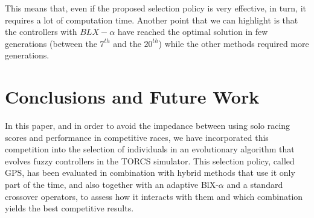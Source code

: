 \documentclass[10pt,journal,compsoc]{IEEEtran}
\begin{document}
This means that, even if the proposed selection policy is very effective, in turn, it requires a lot of computation time.
%
Another point that we can highlight is that the controllers with
$BLX-\alpha$ have reached the optimal solution in few generations
(between the $7^{th}$ and the $20^{th}$) while the other methods required more
generations. 


\section{Conclusions and Future Work} 
\label{sec:conclusions}

In this paper, and in order to avoid the impedance between using solo
racing scores and performance in competitive races, we have
incorporated this competition into the selection of individuals in an
evolutionary algorithm that evolves fuzzy controllers in the TORCS
simulator. This selection policy, called GPS, has been evaluated in combination with hybrid methods that use it only part of the time, and also together with an adaptive BlX-$\alpha$ and a standard crossover operators, to assess how it interacts with them and which combination yields the best competitive results.


\end{document}
